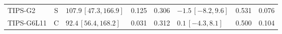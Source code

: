 \begin{longtable}{lcp{37mm}rrp{37mm}rr}
TIPS-G2 & S & \(107.9\,[47.3,166.9]\) & 0.125 & 0.306 & \(-1.5\,[-8.2,9.6]\) & 0.531 & 0.076\\
TIPS-G6L11 & C & \(92.4\,[56.4,168.2]\) & 0.031 & 0.312 & \(0.1\,[-4.3,8.1]\) & 0.500 & 0.104\\

\end{longtable}
